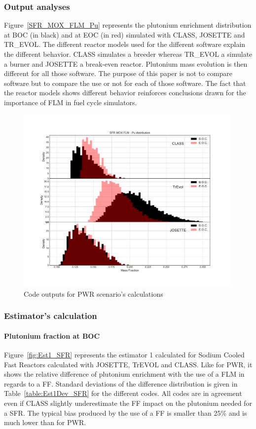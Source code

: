 \subsubsection{Output analyses}
Figure~\ref{SFR_MOX_FLM_Pu} represents the plutonium enrichment distribution at BOC (in black) and at EOC (in red) simulated with CLASS, JOSETTE and TR\_EVOL. The different reactor models used for the different software explain the different behavior. CLASS simulates a breeder whereas TR\_EVOL a simulate a burner and JOSETTE a break-even reactor. Plutonium mass evolution is then different for all those software. The purpose of this paper is not to compare software but to compare the use or not for each of those software. The fact that the reactor models shows different behavior reinforces conclusions drawn for the importance of FLM in fuel cycle simulators.     
\begin{figure}[h]
	\begin{center}
		\includegraphics[width = 0.99\textwidth]{../../Feature_1/RAW_DATA/FIG/SFR_MOX_FLM_Pu.pdf}
		\caption{Code outputs for PWR scenario's calculations}
		\label{fig:SFR_MOX_FLM_Pu}
	\end{center}
\end{figure}

\subsubsection{Estimator's calculation}
\paragraph{Plutonium fraction at BOC}
Figure~\ref{fig:Est1_SFR} represents the estimator 1 calculated for Sodium Cooled Fast Reactors calculated with JOSETTE, TrEVOL and CLASS. Like for PWR, it shows the relative difference of plutonium enrichment with the use of a FLM in regards to a FF. Standard deviations of the difference distribution is given in Table~\ref{table:Est1Dev_SFR} for the different codes. All codes are in agreement even if CLASS slightly underestimate the FF impact on the plutonium needed for a SFR. The typical bias produced by the use of a FF is smaller than 25\% and is much lower than for PWR.   

